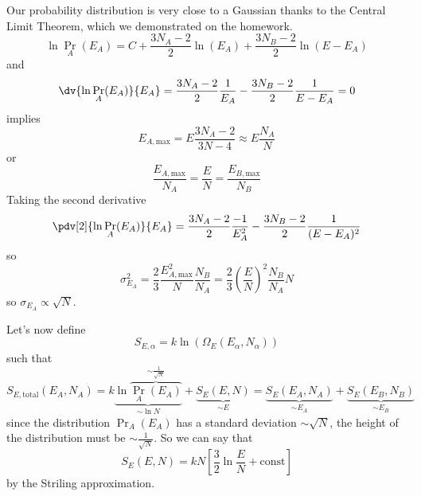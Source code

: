 \documentclass[a4paper,twoside,master.tex]{subfiles}
\begin{document}
Our probability distribution is very close to a Gaussian thanks to the Central Limit Theorem, which we demonstrated on the homework.
\begin{equation}
    \ln{\Pr_{A}(E_A)} = C + \frac{3N_A-2}{2} \ln(E_A) + \frac{3N_B-2}{2} \ln(E-E_A)
\end{equation}
and
\begin{equation}
    \dv{\ln{\Pr_{A}(E_A)}}{E_A} = \frac{3N_A - 2}{2} \frac{1}{E_A} - \frac{3N_B - 2}{2} \frac{1}{E - E_A} = 0
\end{equation}
implies
\begin{equation}
    E_{A,\text{max}} = E \frac{3N_A - 2}{3N-4} \approx E \frac{N_A}{N}
\end{equation}
or
\begin{equation}
    \frac{E_{A, \text{max}}}{N_A} = \frac{E}{N} = \frac{E_{B, \text{max}}}{N_B}
\end{equation}
Taking the second derivative
\begin{equation}
    \pdv[2]{\ln{\Pr_{A}(E_A)}}{E_A} = \frac{3N_A - 2}{2} \frac{-1}{E_A^2} - \frac{3N_B - 2}{2} \frac{1}{(E-E_A)^2}
\end{equation}
so
\begin{equation}
    \sigma^2_{E_A} = \frac{2}{3} \frac{E^2_{A, \text{max}}}{N} \frac{N_B}{N_A} = \frac{2}{3} \left( \frac{E}{N} \right)^2 \frac{N_B}{N_A} N
\end{equation}
so $ \sigma_{E_A} \propto \sqrt{N} $. 

Let's now define
\begin{equation}
    S_{E, \alpha} = k \ln(\Omega_E(E_{\alpha}, N_{\alpha}))
\end{equation}
such that
\begin{equation}
    S_{E, \text{total}}(E_A,N_A) = k \underbrace{\ln{\overbrace{\Pr_{A}(E_A)}^{\sim \frac{1}{\sqrt{N}}}}}_{\sim\ln{N}}  + \underbrace{S_E(E,N)}_{\sim E} = \underbrace{S_E(E_A,N_A)}_{\sim E_A} + \underbrace{S_E(E_B,N_B)}_{\sim E_B}
\end{equation}
since the distribution $ \Pr_{A}(E_A) $ has a standard deviation $ \sim \sqrt{N} $, the height of the distribution must be $ \sim \frac{1}{\sqrt{N}} $.
So we can say that
\begin{equation}
    S_E(E,N) = kN \left[ \frac{3}{2} \ln{\frac{E}{N}} + \text{const} \right]
\end{equation}
by the Striling approximation.
\end{document}
